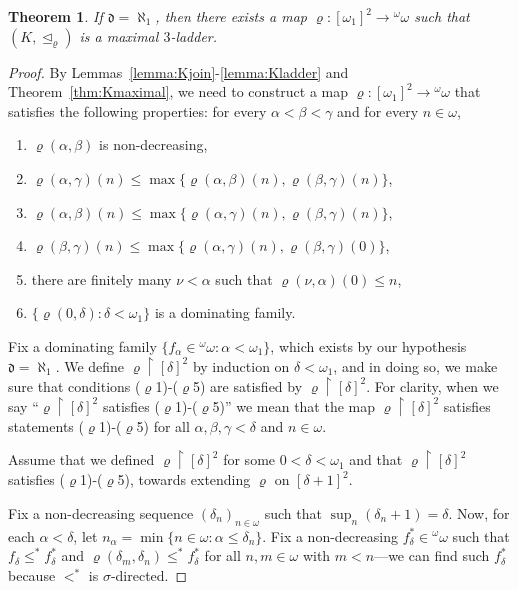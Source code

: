 \documentclass[]{amsart}
\newtheorem{theorem}{Theorem}[section]
\theoremstyle{definition}
\theoremstyle{remark}
\begin{document}
\begin{theorem}\label{thm:Kexistence}
If $\mathfrak{d}= \aleph_1$, then there exists a map $\varrho:[\omega_1]^2 \rightarrow {}^\omega \omega$ such that $(K, \trianglelefteq_\varrho)$ is a maximal $3$-ladder.
\end{theorem}
\begin{proof}
By Lemmas~\ref{lemma:Kjoin}-\ref{lemma:Kladder} and Theorem~\ref{thm:Kmaximal}, we need to construct a map $\varrho:[\omega_1]^2 \rightarrow {}^\omega \omega$ that satisfies the following properties: for every $\alpha < \beta < \gamma$ and for every $n\in\omega$,
\begin{enumerate}[label={\upshape ($\varrho$\arabic*)}]
\item $\varrho(\alpha, \beta)$ is non-decreasing,
\item $\varrho(\alpha, \gamma)(n) \le \max \{\varrho(\alpha, \beta)(n), \varrho(\beta, \gamma)(n)\}$,
\item $\varrho(\alpha, \beta)(n) \le \max \{\varrho(\alpha, \gamma)(n), \varrho(\beta, \gamma)(n)\}$,
\item $\varrho(\beta, \gamma)(n) \le \max \{\varrho(\alpha, \gamma)(n), \varrho(\beta, \gamma)(0)\}$,
\item there are finitely many $\nu < \alpha$ such that $\varrho(\nu, \alpha)(0) \le n$,
\item $\{\varrho(0, \delta) : \delta < \omega_1\}$ is a dominating family.
\end{enumerate}


Fix a dominating family $\{f_\alpha \in {}^\omega \omega : \alpha < \omega_1\}$, which exists by our hypothesis $\mathfrak{d}= \aleph_1$.  We define $\varrho \upharpoonright [\delta]^2$ by induction on $\delta < \omega_1$, and in doing so, we make sure that conditions ($\varrho$1)-($\varrho$5) are satisfied by $\varrho \upharpoonright [\delta]^2$. For clarity, when we say ``$\varrho \upharpoonright [\delta]^2$ satisfies ($\varrho$1)-($\varrho$5)'' we mean that the map $\varrho \upharpoonright [\delta]^2$ satisfies statements ($\varrho$1)-($\varrho$5) for all $\alpha, \beta, \gamma < \delta$ and $n\in\omega$.

Assume that we defined $\varrho \upharpoonright [\delta]^2$  for some $0 <\delta < \omega_1$ and that $\varrho \upharpoonright [\delta]^2$ satisfies ($\varrho$1)-($\varrho$5), towards extending $\varrho$ on $[\delta +1]^2$.

Fix a non-decreasing sequence $(\delta_n)_{n\in\omega}$ such that $\sup_n (\delta_n+1) = \delta$. Now, for each $\alpha < \delta$, let $n_\alpha = \min\{ n \in \omega : \alpha \le \delta_n\}$. Fix a non-decreasing $f^*_\delta \in {}^\omega \omega$ such that $f_\delta \le^* f^*_\delta$ and $\varrho(\delta_m, \delta_n) \le^* f^*_\delta$ for all $n, m \in \omega$ with $m < n$---we can find such $f_\delta^*$ because $<^*$ is $\sigma$-directed. 


\end{proof}
\end{document}
